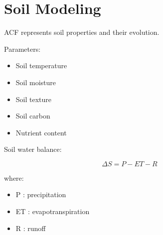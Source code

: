 \section{Soil Modeling}


ACF represents soil properties and their evolution.



Parameters:


\begin{itemize}

\item Soil temperature

\item Soil moisture

\item Soil texture

\item Soil carbon

\item Nutrient content

\end{itemize}



Soil water balance:


\[
\Delta S=P-ET-R
\]


where:


\begin{itemize}

\item P : precipitation

\item ET : evapotranspiration

\item R : runoff

\end{itemize}
